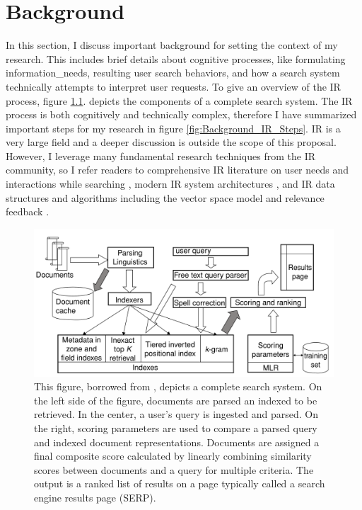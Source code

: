 \chapter{Background} \label{ch:[chapter 2 label]}

In this section, I discuss important background for setting the context of my research. This includes brief details about cognitive processes, like formulating \gls{information_need}s, resulting user search behaviors, and how a search system technically attempts to interpret user requests. To give an overview of the IR process, figure \ref{fig:Background_Complete_Search_System}. depicts the components of a complete search system. The IR  process is both cognitively and technically complex, therefore I have summarized important steps for my research in figure \ref{fig:Background_IR_Steps}. IR is a very large field and a deeper discussion is outside the scope of this proposal. However, I leverage many fundamental research techniques from the IR community, so I refer readers to comprehensive IR literature on user needs and interactions while searching \cite{White2016}, modern IR system architectures \cite{Baeza-Yates1999}, and IR data structures and algorithms including the vector space model and relevance feedback \cite{Buckley1985}.

\begin{figure}
    \centering
    \includegraphics[width=1\textwidth]{../figures/Background_Complete_Search_System.png}
    \caption{This figure, borrowed from \cite{Manning2008}, depicts a complete search system. On the left side of the figure, documents are parsed an indexed to be retrieved. In the center, a user’s query is ingested and parsed. On the right, scoring parameters are used to compare a parsed query and indexed document representations. Documents are assigned a final composite score calculated by linearly combining similarity scores between documents and a query for multiple criteria. The output is a ranked list of results on a page typically called a search engine results page (SERP).}
    \label{fig:Background_Complete_Search_System}
\end{figure}

